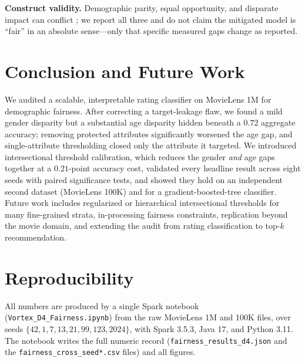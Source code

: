 \documentclass[conference]{IEEEtran}
\begin{document}
\textbf{Construct validity.} Demographic parity, equal opportunity, and disparate
impact can conflict \cite{verma2018fairness}; we report all three and do not claim
the mitigated model is ``fair'' in an absolute sense---only that specific measured
gaps change as reported.

\section{Conclusion and Future Work}
We audited a scalable, interpretable rating classifier on MovieLens 1M for
demographic fairness. After correcting a target-leakage flaw, we found a mild gender
disparity but a substantial age disparity hidden beneath a $0.72$ aggregate accuracy;
removing protected attributes significantly worsened the age gap, and single-attribute
thresholding closed only the attribute it targeted. We introduced intersectional
threshold calibration, which reduces the gender \emph{and} age gaps together at a
$0.21$-point accuracy cost, validated every headline result across eight seeds with
paired significance tests, and showed they hold on an independent second dataset
(MovieLens 100K) and for a gradient-boosted-tree classifier. Future work includes
regularized or hierarchical intersectional thresholds for many fine-grained strata,
in-processing fairness constraints, replication beyond the movie domain, and extending the
audit from rating classification to top-$k$ recommendation.

\section*{Reproducibility}
All numbers are produced by a single Spark notebook (\texttt{Vortex\_D4\_Fairness.ipynb})
from the raw MovieLens 1M and 100K files, over seeds $\{42,1,7,13,21,99,123,2024\}$, with
Spark 3.5.3, Java 17, and Python 3.11. The notebook writes the full numeric record
(\texttt{fairness\_results\_d4.json} and the \texttt{fairness\_cross\_seed*.csv} files) and
all figures.



\end{document}
